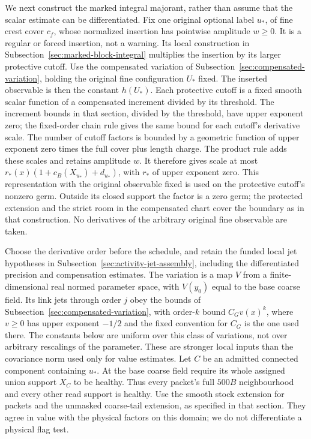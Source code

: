 We next construct the marked integral majorant, rather than assume
that the scalar estimate can be differentiated. Fix one original
optional label $u_*$, of fine crest cover $c_f$, whose normalized
insertion has pointwise amplitude $w\ge0$. It is a regular or forced
insertion, not a warning. Its local construction in
Subsection~\ref{sec:marked-block-integral} multiplies the insertion by
its larger protective cutoff. Use the compensated variation of
Subsection~\ref{sec:compensated-variation}, holding the original fine
configuration $U_*$ fixed. The inserted observable is then the constant
$h(U_*)$. Each protective cutoff is a fixed smooth scalar function of
a compensated increment divided by its threshold. The increment
bounds in that section, divided by the threshold, have upper exponent
zero; the fixed-order chain rule gives the same bound for each
cutoff's derivative scale. The number of cutoff factors is bounded
by a geometric function of upper exponent zero times the full cover
plus length charge. The product rule adds these scales and retains
amplitude $w$. It therefore gives scale at most
$r_*(x)(1+c_B(X_{u_*})+d_{u_*})$, with $r_*$ of upper exponent zero.
This representation with the original observable fixed is used on
the protective cutoff's nonzero germ. Outside its closed support the
factor is a zero germ; the protected extension and the strict room
in the compensated chart cover the boundary as in that construction.
No derivatives of the arbitrary original fine observable are taken.

Choose the derivative order before the schedule, and retain the
funded local jet hypotheses in Subsection~\ref{sec:activity-jet-assembly},
including the differentiated precision and compensation estimates.
The variation is a map $V$ from a finite-dimensional real normed
parameter space, with $V(y_0)$ equal to the base coarse field. Its
link jets through order $j$ obey the bounds of
Subsection~\ref{sec:compensated-variation}, with order-$k$ bound
$C_G v(x)^k$, where $v\ge0$ has upper exponent $-1/2$ and the
fixed convention for $C_G$ is the one used there. The constants below
are uniform over this class of variations, not over arbitrary
rescalings of the parameter.
These are stronger local inputs than the covariance norm used only
for value estimates. Let $C$ be an admitted connected component
containing $u_*$. At the base coarse field require its whole assigned
union support $X_C$ to be healthy. Thus every packet's full $500B$
neighbourhood and every other read support is healthy. Use the smooth
stock extension for packets and the unmasked coarse-tail extension,
as specified in that section. They agree in value with the physical
factors on this domain; we do not differentiate a physical flag test.

